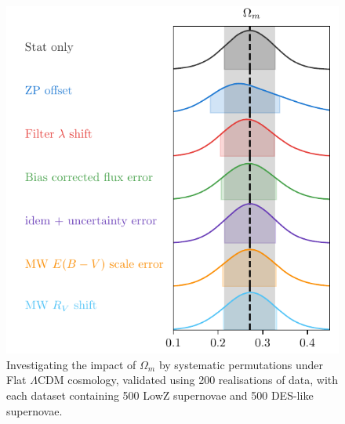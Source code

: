 \documentclass[a4paper,fleqn,usenatbib]{mnras}
\begin{document}
\begin{figure}
	\begin{center}
		\includegraphics[width=\columnwidth]{approximate_systematic_load_summary.pdf}
	\end{center}
	\caption{Investigating the impact of $\Omega_m$ by systematic permutations under Flat $\Lambda$CDM cosmology, validated using 200 realisations of data, with each dataset containing 500 LowZ supernovae and 500 DES-like supernovae.}
	\label{fig:sys_om}
\end{figure}
\end{document}
